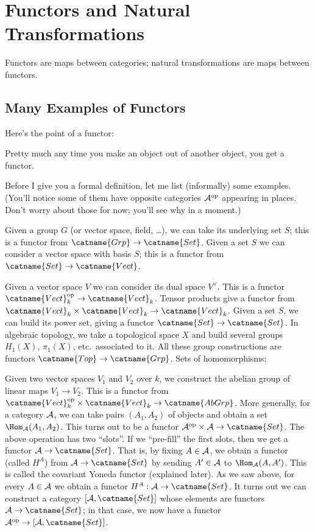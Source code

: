 \chapter{Functors and Natural Transformations}
\label{ch:functors}
Functors are maps between categories; natural transformations are maps between functors.

\section{Many Examples of Functors}
Here's the point of a functor:
\begin{moral}
	Pretty much any time you make an object out of another object,
	you get a functor.
\end{moral}
Before I give you a formal definition, let me list (informally) some examples.
(You'll notice some of them have opposite categories $\AA\op$ appearing in places.
Don't worry about those for now; you'll see why in a moment.)
\begin{itemize}
	\ii Given a group $G$ (or vector space, field, \dots), we can take its underlying set $S$;
	this is a functor from $\catname{Grp} \to \catname{Set}$.
	\ii Given a set $S$ we can consider a vector space with basis $S$;
	this is a functor from $\catname{Set} \to \catname{Vect}$.

	\ii Given a vector space $V$ we can consider its dual space $V^\vee$.
	This is a functor $\catname{Vect}_k\op \to \catname{Vect}_k$.
	\ii Tensor products give a functor from $\catname{Vect}_k \times \catname{Vect}_k \to \catname{Vect}_k$.
	\ii Given a set $S$, we can build its power set, giving a functor $\catname{Set} \to \catname{Set}$.
	\ii In algebraic topology, we take a topological space $X$ and build several groups $H_1(X)$, $\pi_1(X)$,
	etc.\ associated to it. All these group constructions are functors $\catname{Top} \to \catname{Grp}$.
	\ii Sets of homomorphisms:
	\begin{itemize}
		\ii Given two vector spaces $V_1$ and $V_2$ over $k$,
		we construct the abelian group of linear maps $V_1 \to V_2$.
		This is a functor from $\catname{Vect}_k\op \times \catname{Vect}_k \to \catname{AbGrp}$.
		\ii More generally, for a category $\AA$, we can take pairs $(A_1, A_2)$ of objects and
		obtain a set $\Hom_{\AA}(A_1, A_2)$.
		This turns out to be a functor $\AA\op \times \AA \to \catname{Set}$.
		\ii The above operation has two ``slots''.
		If we ``pre-fill'' the first slots, then we get a functor $\AA \to \catname{Set}$.
		That is, by fixing $A \in \AA$, we obtain a functor (called $H^A$)
		from $\AA \to \catname{Set}$ by sending $A' \in \AA$ to $\Hom_{\AA} (A, A')$.
		This is called the covariant Yoneda functor (explained later).
		\ii As we saw above, for every $A \in \AA$ we obtain a functor $H^A : \AA \to \catname{Set}$.
		It turns out we can construct a category $[\AA, \catname{Set}]$
		whose elements are functors $\AA \to \catname{Set}$;
		in that case, we now have a functor $\AA\op \to [\AA, \catname{Set}]$.
	\end{itemize}
\end{itemize}

